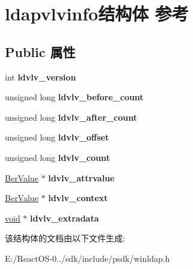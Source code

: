 \hypertarget{structldapvlvinfo}{}\section{ldapvlvinfo结构体 参考}
\label{structldapvlvinfo}
\subsection*{Public 属性}
\begin{DoxyCompactItemize}
\item 
\mbox{\label{structldapvlvinfo_a6bbc8f675951ae01285556186f8c470c}} 
int {\bfseries ldvlv\+\_\+version}
\item 
\mbox{\label{structldapvlvinfo_a5420ef07fb7e70347f7eb1bfb3a8c254}} 
unsigned long {\bfseries ldvlv\+\_\+before\+\_\+count}
\item 
\mbox{\label{structldapvlvinfo_af54849c863f8de27cfab157402822b57}} 
unsigned long {\bfseries ldvlv\+\_\+after\+\_\+count}
\item 
\mbox{\label{structldapvlvinfo_aaf886dabedbedc5cdace66af42a973ac}} 
unsigned long {\bfseries ldvlv\+\_\+offset}
\item 
\mbox{\label{structldapvlvinfo_a1ffe247aa956dd3a3411fbfc148911fc}} 
unsigned long {\bfseries ldvlv\+\_\+count}
\item 
\mbox{\label{structldapvlvinfo_a98e50d4c676c168019217167fd8f719b}} 
\hyperlink{structberval}{Ber\+Value} $\ast$ {\bfseries ldvlv\+\_\+attrvalue}
\item 
\mbox{\label{structldapvlvinfo_af1ca88b5f360afebcfe9f81ac99825ac}} 
\hyperlink{structberval}{Ber\+Value} $\ast$ {\bfseries ldvlv\+\_\+context}
\item 
\mbox{\label{structldapvlvinfo_a8c6323567746a3f1caf53b391849e701}} 
\hyperlink{interfacevoid}{void} $\ast$ {\bfseries ldvlv\+\_\+extradata}
\end{DoxyCompactItemize}


该结构体的文档由以下文件生成\+:\begin{DoxyCompactItemize}
\item 
E\+:/\+React\+O\+S-\/0../sdk/include/psdk/winldap.\+h\end{DoxyCompactItemize}

